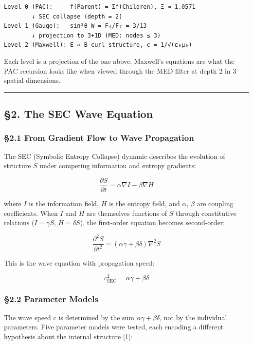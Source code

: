 \documentclass[
  11pt,
  a4paper]{article}
\begin{document}
\begin{verbatim}
Level 0 (PAC):     f(Parent) = Σf(Children), Ξ ≈ 1.0571
        ↓ SEC collapse (depth = 2)
Level 1 (Gauge):   sin²θ_W = F₄/F₇ = 3/13
        ↓ projection to 3+1D (MED: nodes ≤ 3)
Level 2 (Maxwell): E ↔ B curl structure, c = 1/√(ε₀μ₀)
\end{verbatim}

Each level is a projection of the one above. Maxwell's equations are
what the PAC recursion looks like when viewed through the MED filter at
depth 2 in 3 spatial dimensions.

\begin{center}\rule{0.5\linewidth}{0.5pt}\end{center}

\subsection{§2. The SEC Wave Equation}\label{the-sec-wave-equation}

\subsubsection{§2.1 From Gradient Flow to Wave
Propagation}\label{from-gradient-flow-to-wave-propagation}

The SEC (Symbolic Entropy Collapse) dynamic describes the evolution of
structure \(S\) under competing information and entropy gradients:

\[\frac{\partial S}{\partial t} = \alpha\nabla I - \beta\nabla H\]

where \(I\) is the information field, \(H\) is the entropy field, and
\(\alpha\), \(\beta\) are coupling coefficients. When \(I\) and \(H\)
are themselves functions of \(S\) through constitutive relations
(\(I = \gamma S\), \(H = \delta S\)), the first-order equation becomes
second-order:

\[\frac{\partial^2 S}{\partial t^2} = (\alpha\gamma + \beta\delta)\nabla^2 S\]

This is the wave equation with propagation speed:

\[c_\text{SEC}^2 = \alpha\gamma + \beta\delta\]

\subsubsection{§2.2 Parameter Models}\label{parameter-models}

The wave speed \(c\) is determined by the sum
\(\alpha\gamma + \beta\delta\), not by the individual parameters. Five
parameter models were tested, each encoding a different hypothesis about
the internal structure {[}1{]}:
\end{document}
